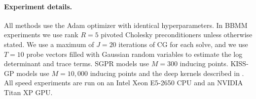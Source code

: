 \paragraph{Experiment details.} All methods use the Adam optimizer \cite{kingma2014adam} with identical hyperparameters.
In BBMM experiments we use rank $R\!=\!5$ pivoted Cholesky preconditioners unless otherwise stated.
We use a maximum of $J\!=\!20$ iterations of CG for each solve, and
we use $T\!=\!10$ probe vectors filled with Gaussian random variables to estimate the log determinant and trace terms.
SGPR models use $M\!=\!300$ inducing points.
KISS-GP models use $M\!=\!10,\!000$ inducing points and the deep kernels described in \cite{wilson2016deep}.
All speed experiments are run on an Intel Xeon E5-2650 CPU and an NVIDIA Titan XP GPU.

